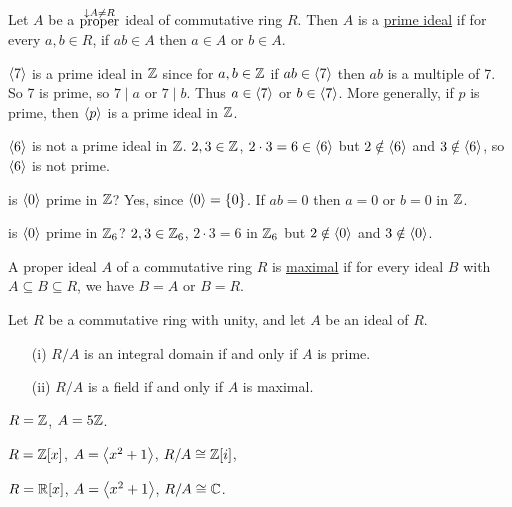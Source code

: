 \documentclass[]{article}
\begin{document}
\begin{definition}
	Let $A$ be a $\overset{\downarrow A\neq R}{\text{proper}}$ ideal of commutative ring $R$. 
	Then $A$ is a \ul{prime ideal} if for every $a,b\in R$, if $ab\in A$ then $a\in A$ or $b\in A$.
\end{definition}
\begin{example}
	$\left\langle 7 \right\rangle$ is a prime ideal in $\mathbb{Z}$ since for $a,b\in\mathbb{Z}$ if $ab\in\left\langle 7 \right\rangle$ then $ab$ is a multiple of 7.
	So 7 is prime, so $7\mid a$ or $7\mid b$. Thus $a\in\left\langle 7 \right\rangle$ or $b\in\left\langle 7 \right\rangle$.
	More generally, if $p$ is prime, then $\left\langle p \right\rangle$ is a prime ideal in $\mathbb{Z}$.
\end{example}
\begin{example}
	 $\left\langle 6 \right\rangle$ is not a prime ideal in $\mathbb{Z}$. $2,3\in\mathbb{Z}$, $2\cdot3=6\in\left\langle 6 \right\rangle$ but $2\notin\left\langle 6 \right\rangle$ and $3\notin\left\langle 6 \right\rangle$, so $\left\langle 6 \right\rangle$ is not prime.
\end{example}
\begin{question}
	is $\left\langle 0 \right\rangle$ prime in $\mathbb{Z}$? Yes, since $\left\langle 0 \right\rangle=\left\{ 0 \right\}$. If $ab=0$ then $a=0$ or $b=0$ in $\mathbb{Z}$.
\end{question}
\begin{question}
	is $\left\langle 0 \right\rangle$ prime in $\mathbb{Z}_6$?
	$2,3\in\mathbb{Z}_6$, $2\cdot3=6$ in $\mathbb{Z}_6$ but $2\notin\left\langle 0 \right\rangle$ and $3\notin\left\langle 0 \right\rangle$.
\end{question}
\begin{definition}
	A proper ideal $A$ of a commutative ring $R$ is \ul{maximal} if for every ideal $B$ with $A\subseteq B\subseteq R$, we have $B=A$ or $B=R$.
\end{definition}
\begin{theorem}
	Let $R$ be a commutative ring with unity, and let $A$ be an ideal of $R$.
	\begin{itemize}
		\item[(i)] $R/A$ is an integral domain if and only if $A$ is prime.
		\item[(ii)] $R/A$ is a field if and only if $A$ is maximal.
	\end{itemize}
\end{theorem}
\begin{example}
	$R=\mathbb{Z}$, $A=5\mathbb{Z}$.

	$R=\mathbb{Z}[x]$, $A=\left\langle x^2+1 \right\rangle$, $R/A\cong\mathbb{Z}[i]$,

	$R=\mathbb{R}[x]$, $A=\left\langle x^2+1 \right\rangle$, $R/A\cong\mathbb{C}$.
\end{example}
\end{document}
